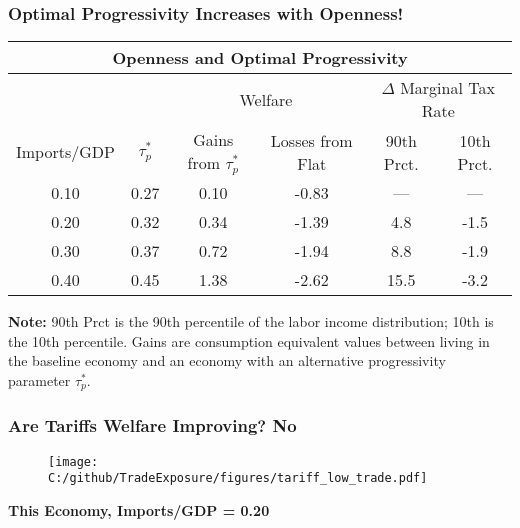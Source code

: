 \documentclass[9pt,pdftex]{beamer}
\theoremstyle{definition}
\begin{document}

\begin{frame}[t]
\frametitle{Optimal Progressivity Increases with Openness!}
\begin{table}[t]
\small
\setlength {\tabcolsep}{1.25mm}
\renewcommand{\arraystretch}{1.5}
\begin{center}
\begin{tabular}{c c c c c c}
\multicolumn{6}{c}{\textbf{\normalsize Openness and Optimal Progressivity }}\\
\hline
\hline
 & & \multicolumn{2}{c}{Welfare} &\multicolumn{2}{c}{$\Delta$ Marginal Tax Rate} \\
Imports/GDP & \small $\tau_p^*$ & \small Gains from $\tau_p^*$ & \small Losses from Flat & 90th Prct. & 10th Prct.\\
\cmidrule(lr){3-4} \cmidrule(lr){5-6}
0.10 & 0.27 & 0.10 & -0.83& --- & --- \\
0.20 & 0.32 & 0.34 & -1.39& 4.8 & -1.5 \\
0.30 & 0.37 & 0.72 & -1.94& 8.8 & -1.9 \\
0.40 & 0.45 & 1.38 & -2.62& 15.5 & -3.2 \\
\hline
\end{tabular}
\parbox[c]{4in}{\vspace{.1cm}
{\footnotesize \textbf{Note:} 90th Prct is the 90th percentile of the labor income distribution; 10th is the 10th percentile. Gains are consumption equivalent values between living in the baseline economy and an economy with an alternative progressivity parameter $\tau_p^*$.}
}
\end{center}
\end{table}
\end{frame}


\begin{frame}[t]
\frametitle{Are Tariffs Welfare Improving? No}
\vspace{-.56cm}
\begin{figure}[p]
\centerline{\texttt{[image: C:/github/TradeExposure/figures/tariff\_low\_trade.pdf]}}
\end{figure}
\small
\vspace{-1.0cm}
\textbf{This Economy, Imports/GDP = 0.20}
\end{frame}
\end{document}
